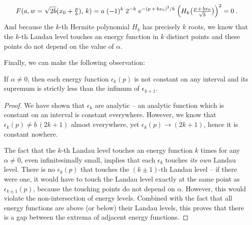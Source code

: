 \begin{equation*}
    F(a, w = \sqrt{2b} ( x_0 + \tfrac{p}{b} ), \, k) =
    a \;
    (-1)^k \;
    2^{-k} \;
    \mathrm{e}^{-( p \, + \, b x_0)^2 / b} \;
    \Big( H_k\big(\tfrac{p \, + \, b x_0}{\sqrt{b}}\big) \Big)^2
    = 0
    \: .
\end{equation*}
And because the $k$-th Hermite polynomial $H_k$ has precisely $k$ roots, we know that the $k$-th Landau level touches an energy function in $k$ distinct points and these points do not depend on the value of $\alpha$.

Finally, we can make the following observation:
\begin{claim}
    If $\alpha \neq 0$, then each energy function $\epsilon_k(p)$ is not constant on any interval and its supremum is strictly less than the infimum of $\epsilon_{k+1}$.
\end{claim}
\begin{proof}
    We have shown that $\epsilon_k$ are analytic – an analytic function which is constant on an interval is constant everywhere. However, we know that $\epsilon_k(p) \neq b \, (2k+1)$ almost everywhere, yet $\epsilon_k(p) \to (2k+1)$, hence it is constant nowhere.

    The fact that the $k$-th Landau level touches an energy function $k$ times for any $\alpha \neq 0$, even infinitesimally small, implies that each $\epsilon_k$ touches \textit{its own} Landau level. There is no $\epsilon_k(p)$ that touches the $(k\pm 1)$-th Landau level – if there were one, it would have to touch the Landau level exactly at the same point as $\epsilon_{k\pm 1}(p)$, because the touching points do not depend on $\alpha$. However, this would violate the non-intersection of energy levels. Combined with the fact that all energy functions are above (or below) their Landau levels, this proves that there is a gap between the extrema of adjacent energy functions.
\end{proof}

